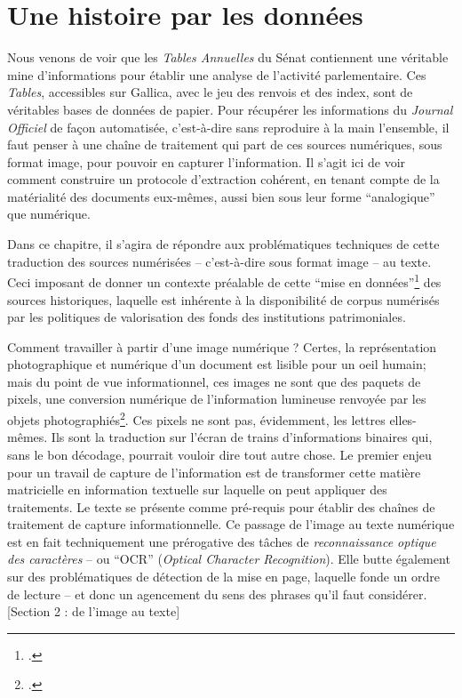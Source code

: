 \chapter{Une histoire par les données}

Nous venons de voir que les \emph{Tables Annuelles} du Sénat contiennent une véritable mine d'informations pour établir une analyse de l'activité parlementaire. Ces \emph{Tables}, accessibles sur Gallica, avec le jeu des renvois et des index, sont de véritables bases de données de papier. Pour récupérer les informations du \emph{Journal Officiel} de façon automatisée, c'est-à-dire sans reproduire à la main l'ensemble, il faut penser à une chaîne de traitement qui part de ces sources numériques, sous format image, pour pouvoir en capturer l'information. Il s'agit ici de voir comment construire un protocole d’extraction cohérent, en tenant compte de la matérialité des documents eux-mêmes, aussi bien sous leur forme \enquote{analogique} que numérique. 

Dans ce chapitre, il s'agira de répondre aux problématiques techniques de cette traduction des sources numérisées -- c'est-à-dire sous format image -- au texte. Ceci imposant de donner un contexte préalable de cette \enquote{mise en données}\footcite[][]{clavert} des sources historiques, laquelle est inhérente à la disponibilité de corpus numérisés par les politiques de valorisation des fonds des institutions patrimoniales. 

Comment travailler à partir d'une image numérique ? Certes, la représentation photographique et numérique d'un document est lisible pour un oeil humain; mais du point de vue informationnel, ces images ne sont que des paquets de pixels, une conversion numérique de l'information lumineuse renvoyée par les objets photographiés\footcite[][]{claerr}. Ces pixels ne sont pas, évidemment, les lettres elles-mêmes. Ils sont la traduction sur l'écran de trains d'informations binaires qui, sans le bon décodage, pourrait vouloir dire tout autre chose. Le premier enjeu pour un travail de capture de l'information est de transformer cette matière matricielle en information textuelle sur laquelle on peut appliquer des traitements. Le texte se présente comme pré-requis pour établir des chaînes de traitement de capture informationnelle. Ce passage de l'image au texte numérique est en fait techniquement une prérogative des tâches de \emph{reconnaissance optique des caractères} -- ou \enquote{OCR} (\emph{Optical Character Recognition}). Elle butte également sur des problématiques de détection de la mise en page, laquelle fonde un ordre de lecture -- et donc un agencement du sens des phrases qu'il faut considérer. [Section 2 : de l'image au texte]

